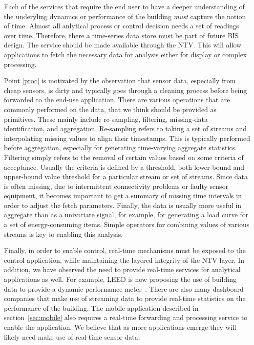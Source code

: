 Each of the services that require the end user to have a deeper understanding of the underyling dynamics or performance
of the building \emph{must} capture the notion of time.  Almost all anlytical process or control decision needs a set of readings
over time.  Therefore, there a time-series data store must be part of future BIS design.  The service should be made available
through the NTV.  This will allow applications to fetch the necessary data for analysis either for display or complex processing.

Point \ref{proc} is motivated by the observation that sensor data, especially from cheap sensors, is dirty and typically goes
through a cleaning process before being forwarded to the end-use application.  There are various operations that are commonly
performed on the data, that we think should be provided as primitives.  These mainly include re-sampling, filtering,  
missing-data identification, and aggregation.  Re-sampling refers to taking a set of streams and interpolating missing values to 
align their timestamps.  This is typically performed before aggregation, especially for generating time-varying aggregate statistics.
Filtering simply refers to the removal of certain values based on some criteria of acceptance.  Usually the criteria is defined
by a threshold, both lower-bound and upper-bound value threshold for a particular stream or set of streams.
Since data is often missing, due to intermittent connectivity problems or faulty sensor equipment, it becomes important to 
get a summary of missing time intervals in order to adjust the fetch parameters.  Finally, the data is usually more
useful in aggregate than as a univariate signal, for example, for generating a load curve for a set of energy-consuming items.
Simple operators for combining values of various streams is key to enabling this analysis.

Finally, in order to enable control, real-time mechanisms must be exposed to the control application, while maintaining the 
layered integrity of the NTV layer.  In addition, we have observed the need to provide real-time services for analytical applications
as well.  For example, LEED is now proposing the use of building data to provide a dynamic performance meter~\cite{DynamicLeed}.
There are also many dashboard companies that make use of streaming data to provide real-time statistics on the performance of the
building.  The mobile application described in section~\ref{sec:mobile} also requires a real-time forwarding and processing service to
enable the application.  We believe that as more applications emerge they will likely need make use of real-time sensor data.






